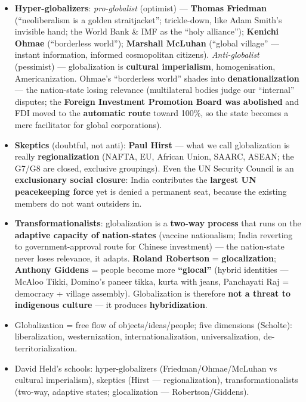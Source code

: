 \begin{KeyConcept}
\begin{itemize}
    \item \textbf{Hyper-globalizers}: \textit{pro-globalist} (optimist) --- \textbf{Thomas Friedman} (``neoliberalism is a golden straitjacket''; trickle-down, like Adam Smith's invisible hand; the World Bank \& IMF as the ``holy alliance''); \textbf{Kenichi Ohmae} (``borderless world''); \textbf{Marshall McLuhan} (``global village'' --- instant information, informed cosmopolitan citizens). \textit{Anti-globalist} (pessimist) --- globalization is \textbf{cultural imperialism}, homogenisation, Americanization. Ohmae's ``borderless world'' shades into \textbf{denationalization} --- the nation-state losing relevance (multilateral bodies judge our ``internal'' disputes; the \textbf{Foreign Investment Promotion Board was abolished} and FDI moved to the \textbf{automatic route} toward 100\%, so the state becomes a mere facilitator for global corporations).
    \item \textbf{Skeptics} (doubtful, not anti): \textbf{Paul Hirst} --- what we call globalization is really \textbf{regionalization} (NAFTA, EU, African Union, SAARC, ASEAN; the G7/G8 are closed, exclusive groupings). Even the UN Security Council is an \textbf{exclusionary social closure}: India contributes the \textbf{largest UN peacekeeping force} yet is denied a permanent seat, because the existing members do not want outsiders in.
    \item \textbf{Transformationalists}: globalization is a \textbf{two-way process} that runs on the \textbf{adaptive capacity of nation-states} (vaccine nationalism; India reverting to government-approval route for Chinese investment) --- the nation-state never loses relevance, it adapts. \textbf{Roland Robertson} = \textbf{glocalization}; \textbf{Anthony Giddens} = people become more \textbf{``glocal''} (hybrid identities --- McAloo Tikki, Domino's paneer tikka, kurta with jeans, Panchayati Raj = democracy + village assembly). Globalization is therefore \textbf{not a threat to indigenous culture} --- it produces \textbf{hybridization}.
\end{itemize}
\end{KeyConcept}

\begin{QuickRevision}
\begin{itemize}
    \item Globalization = free flow of objects/ideas/people; five dimensions (Scholte): liberalization, westernization, internationalization, universalization, de-territorialization.
    \item David Held's schools: hyper-globalizers (Friedman/Ohmae/McLuhan vs cultural imperialism), skeptics (Hirst --- regionalization), transformationalists (two-way, adaptive states; glocalization --- Robertson/Giddens).
\end{itemize}
\end{QuickRevision}

